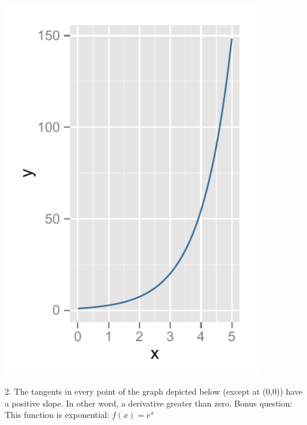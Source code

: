 \documentclass[a4paper]{report}
\begin{document}
\begin{Answer}[ref=ex0]
\begin{minipage}{\rat\textwidth}
\includegraphics[width=0.85\textwidth]{1ab.pdf}
\end{minipage}
\begin{minipage}{\rati\textwidth}
2. The tangents in every point of the graph depicted below (except at ($0$,$0$)) have a positive slope. In other word, a derivative greater than zero. Bonus question: This function is exponential: $f(x)=e^x$
\end{minipage}


\end{Answer}
\end{document}
